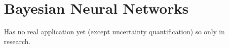 \section{Bayesian Neural Networks} 

  Has no real application yet (except uncertainty quantification) so only in research. 
